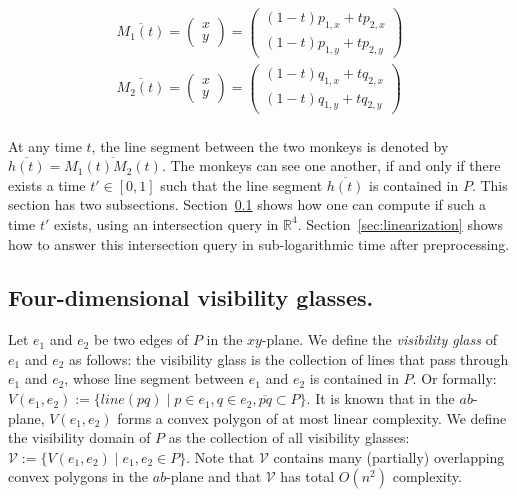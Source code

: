 \documentclass{article}
\begin{document}
\begin{align}
    \overline{M_1(t)} = \left( \begin{array}{c}
         x  \\
         y 
    \end{array}  \right) = \left( \begin{array}{c}
         (1-t)p_{1,x} + t p_{2,x}  \\
         (1-t)p_{1,y} + t p_{2,y} 
    \end{array} \right)  \\
    \overline{M_2(t)} = \left( \begin{array}{c}
         x  \\
         y 
    \end{array}  \right) = \left( \begin{array}{c}
         (1-t)q_{1,x} + t q_{2,x}  \\
         (1-t)q_{1,y} + t q_{2,y} 
    \end{array} \right)  \\
\end{align}

At any time $t$, the line segment between the two monkeys is denoted by $\overline{h(t)} = \overline{M_1(t)M_2(t)}$. The monkeys can see one another, if and only if there exists a time $t' \in [0,1]$ such that the line segment $\overline{h(t)}$ is contained in $P$. This section has two subsections. Section~\ref{sec:answer} shows how one can compute if such a time $t'$ exists, using an intersection query in $\mathbb{R}^4$. Section~\ref{sec:linearization} shows how to answer this intersection query in sub-logarithmic time after preprocessing.

\subsection{Four-dimensional visibility glasses.}
\label{sec:answer}


Let $e_1$ and $e_2$ be two edges of $P$ in the $xy$-plane. We define the \emph{visibility glass} of $e_1$ and $e_2$ as follows: the visibility glass is the collection of lines that pass through $e_1$ and $e_2$, whose line segment between $e_1$ and $e_2$ is contained in $P$. Or formally: $V(e_1, e_2) := \{ line(pq) \mid p \in e_1, q \in e_2,  \overline{pq} \subset P \}$. It is known \cite{} that in the $ab$-plane, $V(e_1, e_2)$ forms a convex polygon of at most linear complexity. We define the visibility domain of $P$ as the collection of all visibility glasses: $\mathcal{V} := \{ V(e_1, e_2) \mid e_1, e_2 \in P \}$. Note that $\mathcal{V}$ contains many (partially) overlapping convex polygons in the $ab$-plane and that $\mathcal{V}$ has total $O(n^2)$ complexity.
\end{document}
